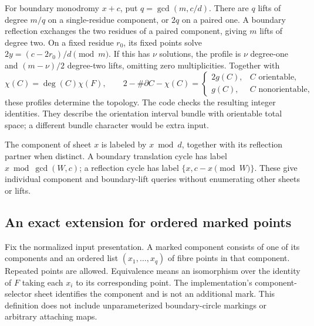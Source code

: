 For boundary monodromy $x+c$, put $q=\gcd(m,c/d)$.  There are $q$ lifts
of degree $m/q$ on a single-residue component, or $2q$ on a paired one.
A boundary reflection exchanges the two residues of a paired component,
giving $m$ lifts of degree two.  On a fixed residue $r_0$, its fixed
points solve $2y=(c-2r_0)/d\pmod m$.  If this has $\nu$ solutions, the
profile is $\nu$ degree-one and $(m-\nu)/2$ degree-two lifts, omitting
zero multiplicities.  Together with
\[
 \chi(C)=\deg(C)\chi(F),\qquad
 2-\#\partial C-\chi(C)=
 \begin{cases}2g(C),&C\text{ orientable},\\g(C),&C\text{ nonorientable},\end{cases}
\]
these profiles determine the topology.  The code checks the resulting
integer identities.  They describe the orientation interval bundle with
orientable total space; a different bundle character would be extra input.

The component of sheet $x$ is labeled by $x\bmod d$, together with its
reflection partner when distinct.  A boundary translation cycle has label
$x\bmod\gcd(W,c)$; a reflection cycle has label $\{x,c-x\pmod W\}$.
These give individual component and boundary-lift queries without
enumerating other sheets or lifts.

\subsection{An exact extension for ordered marked points}

Fix the normalized input presentation.  A marked component consists of
one of its components and an ordered list $(x_1,\ldots,x_q)$ of fibre
points in that component.  Repeated points are allowed.  Equivalence means
an isomorphism over the identity of $F$ taking each $x_i$ to its corresponding
point.  The implementation's component-selector sheet identifies the
component and is not an additional mark.  This definition does not include
unparameterized boundary-circle markings or arbitrary attaching maps.

